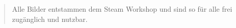 
\cleardoublepage
{}


%

\hspace{100cm}

\begin{quote}
	Alle Bilder entstammen dem Steam Workshop und sind so für alle frei zugänglich und nutzbar. ~\cite{Workshop}
\end{quote}
